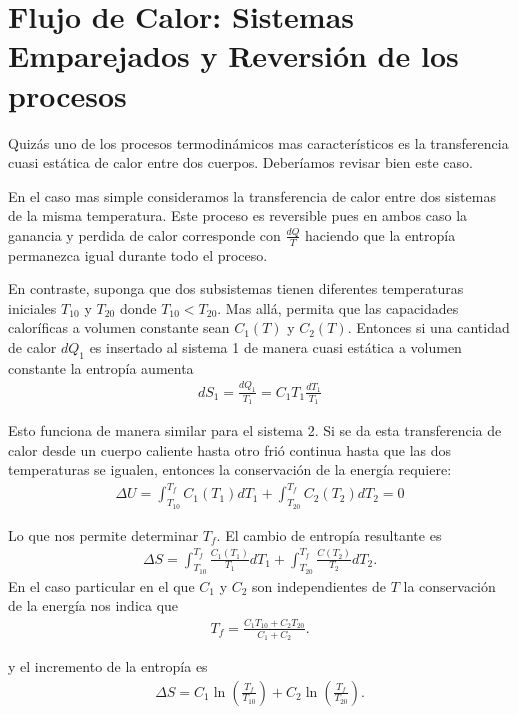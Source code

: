 \documentclass{report}
\begin{document}
\section{Flujo de Calor: Sistemas Emparejados y Reversión de los procesos} \label{4.4}

Quizás uno de los procesos termodinámicos mas característicos es la transferencia cuasi estática de calor entre dos cuerpos. Deberíamos revisar bien este caso.

En el caso mas simple consideramos la transferencia de calor entre dos sistemas de la misma temperatura. Este proceso es reversible pues en ambos caso la ganancia y perdida de calor corresponde con $\frac{dQ}{T}$ haciendo que la entropía permanezca igual durante todo el proceso.

En contraste, suponga que dos subsistemas tienen diferentes temperaturas iniciales $T_{10}$ y $T_{20}$ donde $T_{10}<T_{20}$. Mas allá, permita que las capacidades caloríficas a volumen constante sean $C_1(T)$ y $C_2(T)$. Entonces si una cantidad de calor $dQ_1$ es insertado al sistema 1 de manera cuasi estática a volumen constante la entropía aumenta
\begin{align}
dS_1 = \frac{dQ_1}{T_1}=C_1T_1 \frac{dT_1}{T_1}
\end{align}

Esto funciona de manera similar para el sistema 2. Si se da esta transferencia de calor desde un cuerpo caliente hasta otro frió continua hasta que las dos temperaturas se igualen, entonces la conservación de la energía requiere:
\begin{align}
  \Delta U = \int_{T_{10}}^{T_f}C_1(T_1)dT_1 + \int_{T_{20}}^{T_f}C_2(T_2)dT_2 = 0
\end{align}

Lo que nos permite determinar $T_f$. El cambio de entropía resultante es
 \begin{align}
   \Delta S = \int_{T_{10}}^{T_f} \frac{C_1(T_1)}{T_1}dT_1+\int_{T_{20}}^{T_f}  \frac{C(T_2)}{T_2}dT_2
.\end{align}
En el caso particular en el que $C_1$ y $C_2$ son independientes de $T$ la conservación de la energía nos indica que
 \begin{align}
  T_f = \frac{C_1T_{10} + C_2T_{20}}{C_1+C_2}
.\end{align}

y el incremento de la entropía es
\begin{align}
 \Delta S = C_1\ln\left(\frac{T_f}{T_{10}}\right) + C_2\ln\left(\frac{T_f}{T_{20}}\right)
.\end{align}
\end{document}
